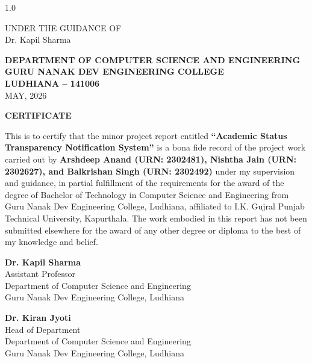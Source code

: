 \documentclass[12pt,a4paper]{report}
\begin{document}
\begin{titlepage}
\begin{spacing}{1.0}
\begin{center}
{\fontsize{14}{16}\selectfont UNDER THE GUIDANCE OF}\\[0.15cm]
{\fontsize{14}{16}\selectfont Dr. Kapil Sharma}
\end{center}

\vspace{0.5cm}
{\fontsize{14pt}{18pt}\selectfont\bfseries DEPARTMENT OF COMPUTER SCIENCE AND ENGINEERING\\[0.2cm]GURU NANAK DEV ENGINEERING COLLEGE\\[0.2cm]LUDHIANA -- 141006}\\[0.3cm]
{\fontsize{12pt}{14pt}\selectfont MAY, 2026}

\end{spacing}
\end{titlepage}


\newpage
\begin{center}{\fontsize{16pt}{18pt}\selectfont\textbf{CERTIFICATE}}\end{center}
\vspace{1cm}
\noindent This is to certify that the minor project report entitled \textbf{``Academic Status Transparency Notification System''} is a bona fide record of the project work carried out by \textbf{Arshdeep Anand (URN: 2302481), Nishtha Jain (URN: 2302627), and Balkrishan Singh (URN: 2302492)} under my supervision and guidance, in partial fulfillment of the requirements for the award of the degree of Bachelor of Technology in Computer Science and Engineering from Guru Nanak Dev Engineering College, Ludhiana, affiliated to I.K. Gujral Punjab Technical University, Kapurthala. The work embodied in this report has not been submitted elsewhere for the award of any other degree or diploma to the best of my knowledge and belief.

\vspace{3cm}
\noindent\textbf{Dr. Kapil Sharma}\\
Assistant Professor\\
Department of Computer Science and Engineering\\
Guru Nanak Dev Engineering College, Ludhiana

\vspace{2cm}
\noindent\textbf{Dr. Kiran Jyoti}\\
Head of Department\\
Department of Computer Science and Engineering\\
Guru Nanak Dev Engineering College, Ludhiana
\end{document}

